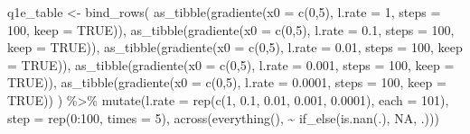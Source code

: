 \documentclass[
  a4paperpaper,
]{article}
\newenvironment{Shaded}{\begin{snugshade}}{\end{snugshade}}
\newcommand{\AttributeTok}[1]{\textcolor[rgb]{0.40,0.45,0.13}{#1}}
\newcommand{\ConstantTok}[1]{\textcolor[rgb]{0.56,0.35,0.01}{#1}}
\newcommand{\DecValTok}[1]{\textcolor[rgb]{0.68,0.00,0.00}{#1}}
\newcommand{\FloatTok}[1]{\textcolor[rgb]{0.68,0.00,0.00}{#1}}
\newcommand{\FunctionTok}[1]{\textcolor[rgb]{0.28,0.35,0.67}{#1}}
\newcommand{\NormalTok}[1]{\textcolor[rgb]{0.00,0.23,0.31}{#1}}
\newcommand{\OtherTok}[1]{\textcolor[rgb]{0.00,0.23,0.31}{#1}}
\newcommand{\SpecialCharTok}[1]{\textcolor[rgb]{0.37,0.37,0.37}{#1}}
\newcommand{\StringTok}[1]{\textcolor[rgb]{0.13,0.47,0.30}{#1}}
\begin{document}
\begin{Shaded}
\begin{Highlighting}[]
\NormalTok{q1e\_table }\OtherTok{\textless{}{-}} \FunctionTok{bind\_rows}\NormalTok{(}
  \FunctionTok{as\_tibble}\NormalTok{(}\FunctionTok{gradiente}\NormalTok{(}\AttributeTok{x0 =} \FunctionTok{c}\NormalTok{(}\DecValTok{0}\NormalTok{,}\DecValTok{5}\NormalTok{), }\AttributeTok{l.rate =} \DecValTok{1}\NormalTok{, }\AttributeTok{steps =} \DecValTok{100}\NormalTok{, }\AttributeTok{keep =} \ConstantTok{TRUE}\NormalTok{)),}
  \FunctionTok{as\_tibble}\NormalTok{(}\FunctionTok{gradiente}\NormalTok{(}\AttributeTok{x0 =} \FunctionTok{c}\NormalTok{(}\DecValTok{0}\NormalTok{,}\DecValTok{5}\NormalTok{), }\AttributeTok{l.rate =} \FloatTok{0.1}\NormalTok{, }\AttributeTok{steps =} \DecValTok{100}\NormalTok{, }\AttributeTok{keep =} \ConstantTok{TRUE}\NormalTok{)),}
  \FunctionTok{as\_tibble}\NormalTok{(}\FunctionTok{gradiente}\NormalTok{(}\AttributeTok{x0 =} \FunctionTok{c}\NormalTok{(}\DecValTok{0}\NormalTok{,}\DecValTok{5}\NormalTok{), }\AttributeTok{l.rate =} \FloatTok{0.01}\NormalTok{, }\AttributeTok{steps =} \DecValTok{100}\NormalTok{, }\AttributeTok{keep =} \ConstantTok{TRUE}\NormalTok{)),}
  \FunctionTok{as\_tibble}\NormalTok{(}\FunctionTok{gradiente}\NormalTok{(}\AttributeTok{x0 =} \FunctionTok{c}\NormalTok{(}\DecValTok{0}\NormalTok{,}\DecValTok{5}\NormalTok{), }\AttributeTok{l.rate =} \FloatTok{0.001}\NormalTok{, }\AttributeTok{steps =} \DecValTok{100}\NormalTok{, }\AttributeTok{keep =} \ConstantTok{TRUE}\NormalTok{)),}
  \FunctionTok{as\_tibble}\NormalTok{(}\FunctionTok{gradiente}\NormalTok{(}\AttributeTok{x0 =} \FunctionTok{c}\NormalTok{(}\DecValTok{0}\NormalTok{,}\DecValTok{5}\NormalTok{), }\AttributeTok{l.rate =} \FloatTok{0.0001}\NormalTok{, }\AttributeTok{steps =} \DecValTok{100}\NormalTok{, }\AttributeTok{keep =} \ConstantTok{TRUE}\NormalTok{))}
\NormalTok{) }\SpecialCharTok{\%\textgreater{}\%}
  \FunctionTok{mutate}\NormalTok{(}\AttributeTok{l.rate =} \FunctionTok{rep}\NormalTok{(}\FunctionTok{c}\NormalTok{(}\StringTok{\textquotesingle{}1\textquotesingle{}}\NormalTok{, }\StringTok{\textquotesingle{}0.1\textquotesingle{}}\NormalTok{, }\StringTok{\textquotesingle{}0.01\textquotesingle{}}\NormalTok{, }\StringTok{\textquotesingle{}0.001\textquotesingle{}}\NormalTok{, }\StringTok{\textquotesingle{}0.0001\textquotesingle{}}\NormalTok{), }\AttributeTok{each =} \DecValTok{101}\NormalTok{),}
         \AttributeTok{step =} \FunctionTok{rep}\NormalTok{(}\DecValTok{0}\SpecialCharTok{:}\DecValTok{100}\NormalTok{, }\AttributeTok{times =} \DecValTok{5}\NormalTok{),}
         \FunctionTok{across}\NormalTok{(}\FunctionTok{everything}\NormalTok{(), }\SpecialCharTok{\textasciitilde{}} \FunctionTok{if\_else}\NormalTok{(}\FunctionTok{is.nan}\NormalTok{(.), }\ConstantTok{NA}\NormalTok{, .)))}


\end{Highlighting}
\end{Shaded}
\end{document}
